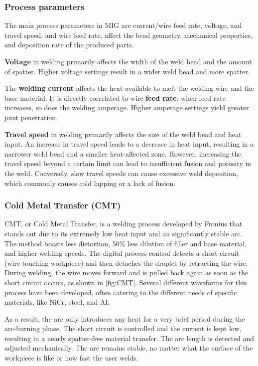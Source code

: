 \subsubsection{Process parameters}

The main process parameters in MIG are current/wire feed rate, voltage, and travel speed, and wire feed rate, affect the bead geometry, mechanical properties, and deposition rate of the produced parts. \cite{Malaysia_2019}


\textbf{Voltage} in welding primarily affects the width of the weld bead and the amount of spatter. Higher voltage settings result in a wider weld bead and more spatter.

The \textbf{welding current} affects the heat available to melt the welding wire and the base material. It is directly correlated to wire \textbf{feed rate}: when feed rate increases, so does the welding amperage. Higher amperage settings yield greater joint penetration.

\textbf{Travel speed} in welding primarily affects the size of the weld bead and heat input. An increase in travel speed leads to a decrease in heat input, resulting in a narrower weld bead and a smaller heat-affected zone. However, increasing the travel speed beyond a certain limit can lead to insufficient fusion and porosity in the weld. Conversely, slow travel speeds can cause excessive weld deposition, which commonly causes cold lapping or a lack of fusion.



\subsubsection{Cold Metal Transfer (CMT)}

CMT, or Cold Metal Transfer, is a welding process developed by Fronius that stands out due to its extremely low heat input and an significantly stable arc. The method boasts less distortion, 50\% less dilution of filler and base material, and higher welding speeds.
The digital process control detects a short circuit (wire touching workpiece) and then detaches the droplet by retracting the wire. During welding, the wire moves forward and is pulled back again as soon as the short circuit occurs, as shown in \autoref{fig:CMT}. Several different waveforms for this process have been developed, often catering to the different needs of specific materials, like NiCr, steel, and Al. \cite{Kah_Latifi_Suoranta_Martikainen_Pirinen_2014}

As a result, the arc only introduces any heat for a very brief period during the arc-burning phase. The short circuit is controlled and the current is kept low, resulting in a nearly spatter-free material transfer. The arc length is detected and adjusted mechanically. The arc remains stable, no matter what the surface of the workpiece is like or how fast the user welds.

